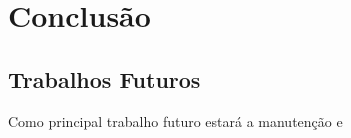 \chapter{Conclusão}

\section{Trabalhos Futuros}

Como principal trabalho futuro estará a manutenção e 
